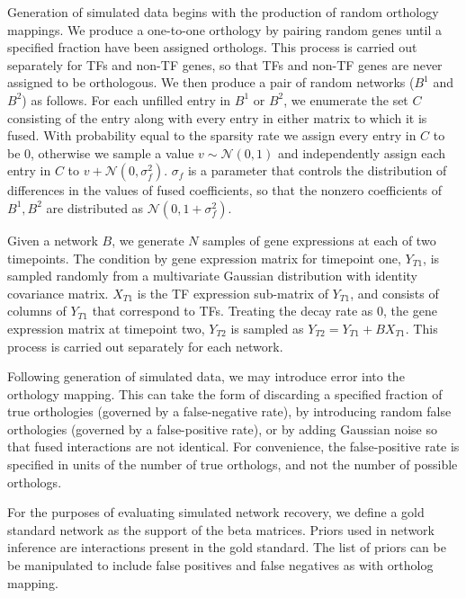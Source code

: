 \documentclass[11pt]{article}
\begin{document}
Generation of simulated data begins with the production of random orthology mappings. We produce a one-to-one orthology by pairing random genes until a specified fraction have been assigned orthologs. This process is carried out separately for TFs and non-TF genes, so that TFs and non-TF genes are never assigned to be orthologous. We then produce a pair of random networks ($B^1$ and $B^2$) as follows. For each unfilled entry in $B^1$ or $B^2$, we enumerate the set $C$ consisting of the entry along with every entry in either matrix to which it is fused. With probability equal to the sparsity rate we assign every entry in $C$ to be 0, otherwise we sample a value $v \sim \mathcal{N}(0,1)$ and independently assign each entry in $C$ to $v + \mathcal{N}(0, \sigma_f^2)$. $\sigma_f$ is a parameter that controls the distribution of differences in the values of fused coefficients, so that the nonzero coefficients of $B^1, B^2$ are distributed as $\mathcal{N}(0, 1 + \sigma_f^2)$.

Given a network $B$, we generate $N$ samples of gene expressions at each of two timepoints. The condition by gene expression matrix for timepoint one, $Y_{T1}$, is sampled randomly from a multivariate Gaussian distribution with identity covariance matrix. $X_{T1}$ is the TF expression sub-matrix of $Y_{T1}$, and consists of columns of $Y_{T1}$ that correspond to TFs. Treating the decay rate as 0, the gene expression matrix at timepoint two, $Y_{T2}$ is sampled as $Y_{T2} = Y_{T1} + BX_{T1}$. This process is carried out separately for each network. 

Following generation of simulated data, we may introduce error into the orthology mapping. This can take the form of discarding a specified fraction of true orthologies (governed by a false-negative rate), by introducing random false orthologies (governed by a false-positive rate), or by adding Gaussian noise so that fused interactions are not identical. For convenience, the false-positive rate is specified in units of the number of true orthologs, and not the number of possible orthologs. 

For the purposes of evaluating simulated network recovery, we define a gold standard network as the support of the beta matrices. Priors used in network inference are interactions present in the gold standard. The list of priors can be be manipulated to include false positives and false negatives as with ortholog mapping. 
\end{document}
